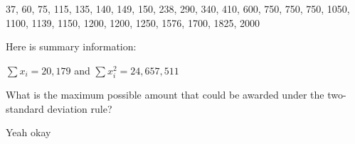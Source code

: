     37, 60, 75, 115, 135, 140, 149, 150, 238, 290, 340, 410, 600, 750, 750, 750, 1050, 1100, 1139, 1150, 1200, 1200, 1250, 1576, 1700, 1825, 2000

    Here is summary information:

    $\sum x_i = 20,179$ and $\sum x_{i}^{2} = 24,657,511$

    What is the maximum possible amount that could be awarded under the two-standard deviation rule?

    \begin{mdframed}
        Yeah okay
    \end{mdframed}
